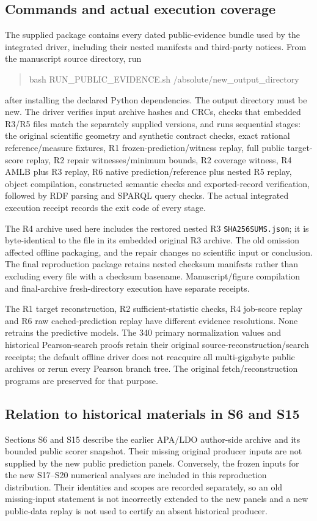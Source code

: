 \subsection{Commands and actual execution coverage}
The supplied package contains every dated public-evidence bundle used by the integrated driver, including their nested manifests and third-party notices. From the manuscript source directory, run
\begin{quote}\small\ttfamily
bash RUN\_PUBLIC\_EVIDENCE.sh /absolute/new\_output\_directory
\end{quote}
after installing the declared Python dependencies. The output directory must be new. The driver verifies input archive hashes and CRCs, checks that embedded R3/R5 files match the separately supplied versions, and runs sequential stages: the original scientific geometry and synthetic contract checks, exact rational reference/measure fixtures, R1 frozen-prediction/witness replay, full public target-score replay, R2 repair witnesses/minimum bounds, R2 coverage witness, R4 AMLB plus R3 replay, R6 native prediction/reference plus nested R5 replay, object compilation, constructed semantic checks and exported-record verification, followed by RDF parsing and SPARQL query checks. The actual integrated execution receipt records the exit code of every stage.

The R4 archive used here includes the restored nested R3 \texttt{SHA256SUMS.json}; it is byte-identical to the file in its embedded original R3 archive. The old omission affected offline packaging, and the repair changes no scientific input or conclusion. The final reproduction package retains nested checksum manifests rather than excluding every file with a checksum basename. Manuscript/figure compilation and final-archive fresh-directory execution have separate receipts.

The R1 target reconstruction, R2 sufficient-statistic checks, R4 job-score replay and R6 raw cached-prediction replay have different evidence resolutions. None retrains the predictive models. The 340 primary normalization values and historical Pearson-search proofs retain their original source-reconstruction/search receipts; the default offline driver does not reacquire all multi-gigabyte public archives or rerun every Pearson branch tree. The original fetch/reconstruction programs are preserved for that purpose.

\subsection{Relation to historical materials in S6 and S15}
Sections S6 and S15 describe the earlier APA/LDO author-side archive and its bounded public scorer snapshot. Their missing original producer inputs are not supplied by the new public prediction panels. Conversely, the frozen inputs for the new S17--S20 numerical analyses are included in this reproduction distribution. Their identities and scopes are recorded separately, so an old missing-input statement is not incorrectly extended to the new panels and a new public-data replay is not used to certify an absent historical producer.

